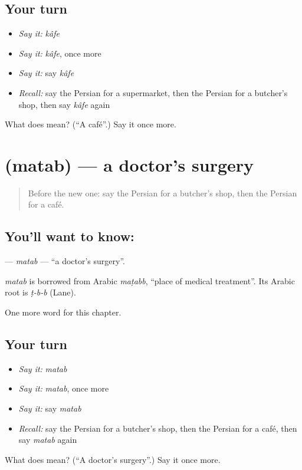 \subsection*{Your turn}
\begin{itemize}
\raggedright
  \item \emph{Say it:} \emph{kâfe}
  \item \emph{Say it:} \emph{kâfe}, once more
  \item \emph{Say it:} say \emph{kâfe}
  \item \emph{Recall:} say the Persian for a supermarket, then the Persian for a butcher's shop, then say \emph{kâfe} again
\end{itemize}

\begin{tcolorbox}[breakable,colback=teal!4,colframe=teal!35!black,title={Before you move on}]
What does  mean? (\textquotedblleft{}A café\textquotedblright{}.) Say it once more.
\end{tcolorbox}
\section[\texorpdfstring{\fa{مطب} (matab)}{مطب (matab)}]{ (matab) — a doctor's surgery}

\label{lesson:FA-C154-matab}



\begin{quote}
Before the new one: say the Persian for a butcher's shop, then the Persian for a café.
\end{quote}

\subsection*{You'll want to know: }
\textbf{} — \emph{matab} — \textquotedblleft{}a doctor's surgery\textquotedblright{}.

\begin{cousinweb}
\emph{matab} is borrowed from Arabic \emph{maṭabb}, \textquotedblleft{}place of medical treatment\textquotedblright{}. Its Arabic root is \emph{ṭ-b-b} (Lane).
\end{cousinweb}

\begin{grammarlens}[title={What you've built}]
One more word for this chapter.
\end{grammarlens}

\subsection*{Your turn}
\begin{itemize}
\raggedright
  \item \emph{Say it:} \emph{matab}
  \item \emph{Say it:} \emph{matab}, once more
  \item \emph{Say it:} say \emph{matab}
  \item \emph{Recall:} say the Persian for a butcher's shop, then the Persian for a café, then say \emph{matab} again
\end{itemize}

\begin{tcolorbox}[breakable,colback=teal!4,colframe=teal!35!black,title={Before you move on}]
What does  mean? (\textquotedblleft{}A doctor's surgery\textquotedblright{}.) Say it once more.
\end{tcolorbox}
